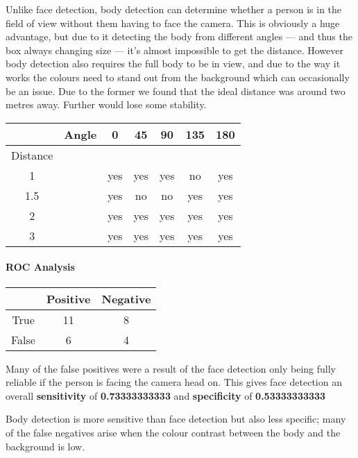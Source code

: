 \documentclass[12pt]{article}
\begin{document}
Unlike face detection, body detection can determine whether a person is in the field of view without them having to face the camera. This is obviously a huge advantage, but due to it detecting the body from different angles --- and thus the box always changing size --- it's almost impossible to get the distance.
However body detection also requires the full body to be in view, and due to the way it works the colours need to stand out from the background which can occasionally be an issue. Due to the former we found that the ideal distance was around two metres away. Further would lose some stability.

\begin{center}
\begin{tabular}{|c|c|c|c|c|c|c|}
\hline
 & Angle & 0 & 45 & 90 & 135 & 180 \\
\hline
Distance & & & & & & \\
1 & & yes & yes & yes & no & yes \\ %
1.5 & & yes & no & no & yes & yes \\
2 & & yes & yes & yes & yes & yes \\ %
3 & & yes & yes & yes & yes & yes \\ %
\hline
\end{tabular}
\end{center}

\paragraph{ROC Analysis}

\begin{center}
\begin{tabular}{|c|c|c|}
\hline
& Positive & Negative\\
\hline
True & 11 & 8 \\
False & 6 & 4 \\

\hline
\end{tabular}
\end{center}
Many of the false positives were a result of the face detection only being fully reliable if the person is facing the camera head on.
This gives face detection an overall \textbf{sensitivity} of \textbf{0.73333333333} and \textbf{specificity} of \textbf{0.53333333333}

Body detection is more sensitive than face detection but also less specific; many of the false negatives arise when the colour contrast between the body and the background is low.
\end{document}
